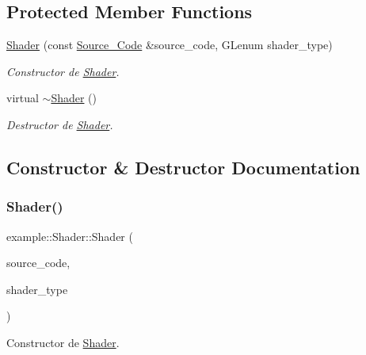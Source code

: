 \subsection*{Protected Member Functions}
\begin{DoxyCompactItemize}
\item 
\mbox{\hyperlink{classexample_1_1_shader_a59b388f5122bdacd19a92b1ff71bcf97}{Shader}} (const \mbox{\hyperlink{classexample_1_1_shader_1_1_source___code}{Source\+\_\+\+Code}} \&source\+\_\+code, G\+Lenum shader\+\_\+type)
\begin{DoxyCompactList}\small\item\em Constructor de \mbox{\hyperlink{classexample_1_1_shader}{Shader}}. \end{DoxyCompactList}\item 
virtual \mbox{\hyperlink{classexample_1_1_shader_a4f124fe7a6be5cfd78bd6e2ee84ca55f}{$\sim$\+Shader}} ()
\begin{DoxyCompactList}\small\item\em Destructor de \mbox{\hyperlink{classexample_1_1_shader}{Shader}}. \end{DoxyCompactList}\end{DoxyCompactItemize}


\subsection{Constructor \& Destructor Documentation}
\mbox{\label{classexample_1_1_shader_a59b388f5122bdacd19a92b1ff71bcf97}} 
\subsubsection{\texorpdfstring{Shader()}{Shader()}}
{\footnotesize\ttfamily example\+::\+Shader\+::\+Shader (\begin{DoxyParamCaption}\item[{const \mbox{\hyperlink{classexample_1_1_shader_1_1_source___code}{Source\+\_\+\+Code}} \&}]{source\+\_\+code,  }\item[{G\+Lenum}]{shader\+\_\+type }\end{DoxyParamCaption})\hspace{0.3cm}{\ttfamily [protected]}}



Constructor de \mbox{\hyperlink{classexample_1_1_shader}{Shader}}. 


